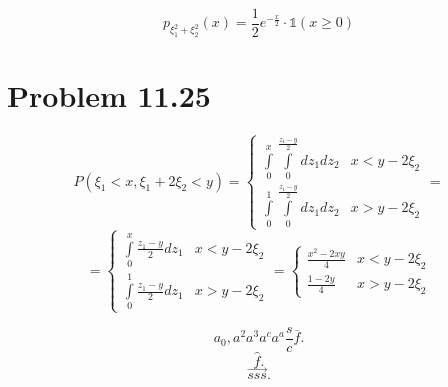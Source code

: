 \documentclass[12pt,letterpaper]{article}
\begin{document}
\[ p_{\xi_1^2 + \xi_2^2}(x) = \frac{1}{2} e^{-\frac{x}{2}} \cdot \mathds{1}(x \geq 0) \]

\section*{Problem 11.25}


\[ P(\xi_1 < x, \xi_1 + 2 \xi_2 < y) = \begin{cases}
    \int\limits_{0}^{x} \int\limits_{0}^{\frac{z_1 - y}{2}} dz_1 dz_2 & x < y - 2\xi_2 \\
    \int\limits_{0}^{1} \int\limits_{0}^{\frac{z_1 - y}{2}} dz_1 dz_2 & x > y - 2\xi_2
\end{cases} = \]
\[ = \begin{cases}
    \int\limits_0^x \frac{z_1 - y}{2} dz_1 & x < y - 2\xi_2 \\
    \int\limits_0^1 \frac{z_1 - y}{2} dz_1 & x > y - 2\xi_2
\end{cases} = \begin{cases}
    \frac{x^2 -2xy}{4} & x < y - 2\xi_2 \\
    \frac{1 - 2y}{4} & x > y - 2\xi_2
\end{cases}\]


\[
a_0, a^2 a^3 a^{c} a^{a} \frac{s}{c} \overline{f}
.\] 
\[
\hat{f}
.\] 
\[
    \vec{sss}
.\] 

\end{document}
